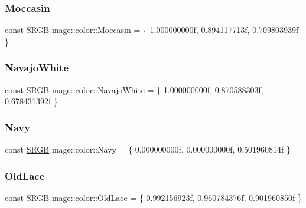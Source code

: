 \hypertarget{namespacemage_1_1color_a05be0c04a51144f0864df90143fa0b3c}{}\label{namespacemage_1_1color_a05be0c04a51144f0864df90143fa0b3c} 
\subsubsection{\texorpdfstring{Moccasin}{Moccasin}}
{\footnotesize\ttfamily const \hyperlink{structmage_1_1_s_r_g_b}{S\+R\+GB} mage\+::color\+::\+Moccasin = \{ 1.\+000000000f, 0.\+894117713f, 0.\+709803939f \}}

\hypertarget{namespacemage_1_1color_a456a2a2bd5e2ddd926237e13027d4123}{}\label{namespacemage_1_1color_a456a2a2bd5e2ddd926237e13027d4123} 
\subsubsection{\texorpdfstring{Navajo\+White}{NavajoWhite}}
{\footnotesize\ttfamily const \hyperlink{structmage_1_1_s_r_g_b}{S\+R\+GB} mage\+::color\+::\+Navajo\+White = \{ 1.\+000000000f, 0.\+870588303f, 0.\+678431392f \}}

\hypertarget{namespacemage_1_1color_a309c380f757119928cd357c51d789708}{}\label{namespacemage_1_1color_a309c380f757119928cd357c51d789708} 
\subsubsection{\texorpdfstring{Navy}{Navy}}
{\footnotesize\ttfamily const \hyperlink{structmage_1_1_s_r_g_b}{S\+R\+GB} mage\+::color\+::\+Navy = \{ 0.\+000000000f, 0.\+000000000f, 0.\+501960814f \}}

\hypertarget{namespacemage_1_1color_afb6a94c9a691ac340ecf5ed94af052c5}{}\label{namespacemage_1_1color_afb6a94c9a691ac340ecf5ed94af052c5} 
\subsubsection{\texorpdfstring{Old\+Lace}{OldLace}}
{\footnotesize\ttfamily const \hyperlink{structmage_1_1_s_r_g_b}{S\+R\+GB} mage\+::color\+::\+Old\+Lace = \{ 0.\+992156923f, 0.\+960784376f, 0.\+901960850f \}}

